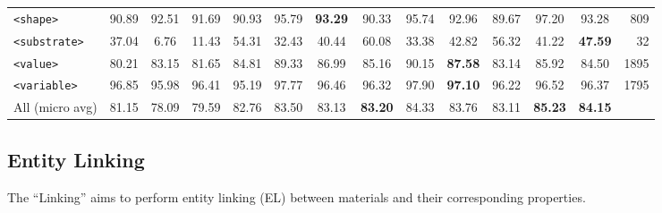\documentclass[]{interact}
\theoremstyle{plain}%
\theoremstyle{definition}
\theoremstyle{remark}
\begin{document}
\begin{table}[ht]
{{\begin{tabular}{l ccc ccc ccc ccc r}
            \texttt{<shape>}       & 90.89                            & 92.51                                     & 91.69                                              & 90.93      & 95.79      & \textbf{93.29} & 90.33          & 95.74      & 92.96          & 89.67      & 97.20          & 93.28          & 809  \\
            \texttt{<substrate>}   & 37.04                            & 6.76                                      & 11.43                                              & 54.31      & 32.43      & 40.44          & 60.08          & 33.38      & 42.82          & 56.32      & 41.22          & \textbf{47.59} & 32   \\
            \texttt{<value>}       & 80.21                            & 83.15                                     & 81.65                                              & 84.81      & 89.33      & 86.99          & 85.16          & 90.15      & \textbf{87.58} & 83.14      & 85.92          & 84.50          & 1895 \\
            \texttt{<variable>}    & 96.85                            & 95.98                                     & 96.41                                              & 95.19      & 97.77      & 96.46          & 96.32          & 97.90      & \textbf{97.10} & 96.22      & 96.52          & 96.37          & 1795 \\
            \midrule
            All (micro avg)        & 81.15                            & 78.09                                     & 79.59                                              & 82.76      & 83.50      & 83.13          & \textbf{83.20} & 84.33      & 83.76          & 83.11      & \textbf{85.23} & \textbf{84.15} &      \\
            \bottomrule
        \end{tabular}
    }
    }
    \label{tab:evaluation-10fold-material-parser}
\end{table}

\subsection{Entity Linking}
\label{subsubsec:linking}

The ``Linking'' aims to perform entity linking (EL) between materials and their corresponding properties.
\end{document}

